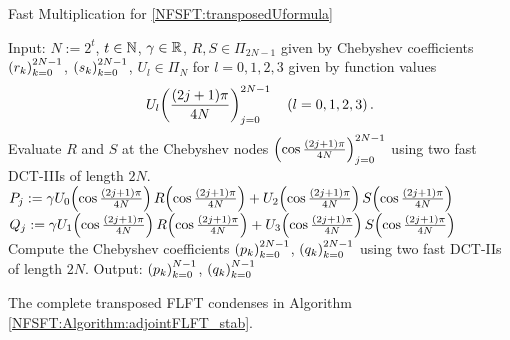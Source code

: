 \begin{algorithm}[tb]
  \caption{Fast Multiplication for \eqref{NFSFT:transposedUformula}}
  \label{NFSFT:Algorithm:Utransposed}
  \begin{algorithmic}
    \STATE Input:  $N := 2^t$, $t \in \mathbb{N}$, $\gamma \in \mathbb{R}$, $R,S \in \Pi_{2N-1}$ given by Chebyshev coefficients \\
    \STATE {} $\left(r_{k}\right)_{k=0}^{2N-1}$, $\left(s_{k}\right)_{k=0}^{2N-1}$, $U_{l} \in \Pi_{N}$ for $l=0,1,2,3$ 
      given by function values
      \[U_{l}{\hspace{-0.4ex}}\left(\frac{(2j+1)\pi}{4N}\right)_{j = 0}^{2N-1} \quad \left(l=0,1,2,3\right).\] 
    \STATE Evaluate $R$ and $S$ at the Chebyshev nodes $\left(\cos \frac{(2j+1)\pi}{4N}\right)_{j = 0}^{2N-1}$
      using two fast DCT-IIIs of length $2N$.
    \STATE 
      \STATE $P_{j} := \gamma U_{0}{\hspace{-0.4ex}}\left(\cos \frac{(2j+1)\pi}{4N}\right) R{\hspace{-0.4ex}}\left(\cos \frac{(2j+1)\pi}{4N}\right) +
                              U_{2}{\hspace{-0.4ex}}\left(\cos \frac{(2j+1)\pi}{4N}\right) S{\hspace{-0.4ex}}\left(\cos \frac{(2j+1)\pi}{4N}\right)$
      \STATE $Q_{j} := \gamma U_{1}{\hspace{-0.4ex}}\left(\cos \frac{(2j+1)\pi}{4N}\right) R{\hspace{-0.4ex}}\left(\cos \frac{(2j+1)\pi}{4N}\right) +
                              U_{3}{\hspace{-0.4ex}}\left(\cos \frac{(2j+1)\pi}{4N}\right) S{\hspace{-0.4ex}}\left(\cos \frac{(2j+1)\pi}{4N}\right)$
    \ENDFOR
    \STATE
    \STATE Compute the Chebyshev coefficients $\left(p_{k}\right)_{k=0}^{2N-1}$, $\left(q_{k}\right)_{k=0}^{2N-1}$ 
      using two fast DCT-IIs of length $2N$.
    \STATE
    \STATE Output: $\left(p_{k}\right)_{k=0}^{N-1}$, $\left(q_{k}\right)_{k=0}^{N-1}$
  \end{algorithmic}
\end{algorithm}  
The complete transposed FLFT condenses in Algorithm \ref{NFSFT:Algorithm:adjointFLFT_stab}.
